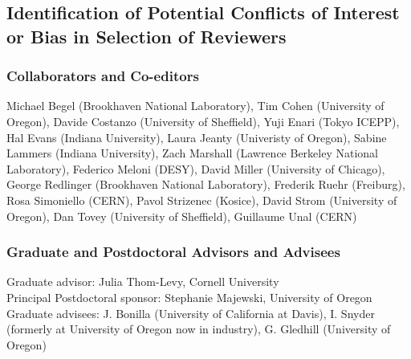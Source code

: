 \documentclass[letter, USenglish, 11pt, subfigure]{article}
\begin{document}
\clearpage
\subsection{Identification of Potential Conflicts of Interest or Bias in Selection of Reviewers}
\subsubsection{Collaborators and Co-editors}
Michael Begel (Brookhaven National Laboratory), Tim Cohen (University of Oregon), Davide Costanzo (University of Sheffield), Yuji Enari (Tokyo ICEPP), Hal Evans (Indiana University), Laura Jeanty (Univeristy of Oregon), Sabine Lammers (Indiana University), Zach Marshall (Lawrence Berkeley National Laboratory), Federico Meloni (DESY), David Miller (University of Chicago), George Redlinger (Brookhaven National Laboratory), Frederik Ruehr (Freiburg), Rosa Simoniello (CERN), Pavol Strizenec (Kosice), David Strom (University of Oregon), Dan Tovey (University of Sheffield), Guillaume Unal (CERN)

\subsubsection{Graduate and Postdoctoral Advisors and Advisees}
Graduate advisor: Julia Thom-Levy, Cornell University
\\Principal Postdoctoral sponsor: Stephanie Majewski, University of Oregon\\
Graduate advisees: J. Bonilla (University of California at Davis), I. Snyder (formerly at University of Oregon now in industry), G. Gledhill (University of Oregon)
\clearpage


\end{document}
